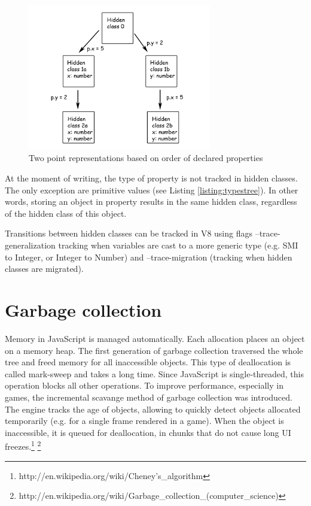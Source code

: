 \begin{figure}[h!]
  \caption{Two point representations based on order of declared properties}
  \label{img:point_tree2}
  \centering
	\includegraphics[width=8cm]{point_tree2}
\end{figure} 

At the moment of writing, the type of property is not tracked in hidden classes. The only exception are primitive values (see Listing \ref{listing:typestree}). In other words, storing an object in property results in the same hidden class, regardless of the hidden class of this object.

Transitions between hidden classes can be tracked in V8 using flags --trace-generalization tracking when variables are cast to a more generic type (e.g. SMI to Integer, or Integer to Number) and --trace-migration (tracking when hidden classes are migrated).



\section{Garbage collection}
\label{sec:garbagecollection}

Memory in JavaScript is managed automatically. Each allocation places an object on a memory heap. The first generation of garbage collection traversed the whole tree and freed memory for all inaccessible objects. This type of deallocation is called mark-sweep and takes a long time. Since JavaScript is single-threaded, this operation blocks all other operations. To improve performance, especially in games, the incremental scavange method of garbage collection was introduced. The engine tracks the age of objects, allowing to quickly detect objects allocated temporarily (e.g. for a single frame rendered in a game). When the object is inaccessible, it is queued for deallocation, in chunks that do not cause long UI freezes.\footnote{http://en.wikipedia.org/wiki/Cheney's\_algorithm} \footnote{http://en.wikipedia.org/wiki/Garbage\_collection\_(computer\_science)}


